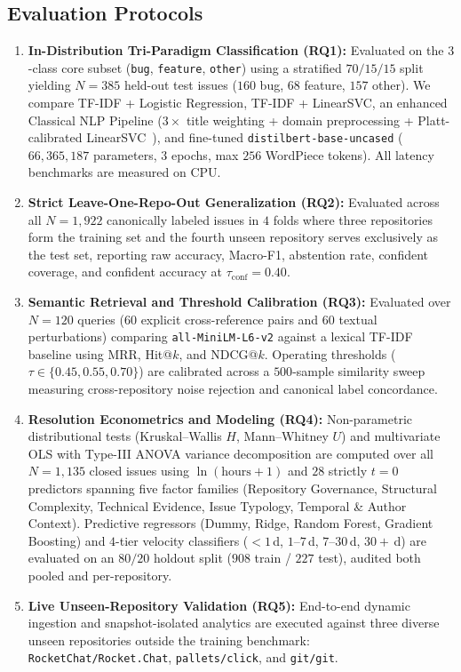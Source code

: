 \documentclass[conference]{IEEEtran}
\begin{document}
\subsection{Evaluation Protocols}
\begin{enumerate}
    \item \textbf{In-Distribution Tri-Paradigm Classification (RQ1):} Evaluated on the $3$-class core subset (\texttt{bug}, \texttt{feature}, \texttt{other}) using a stratified $70/15/15$ split yielding $N=385$ held-out test issues ($160$ bug, $68$ feature, $157$ other). We compare TF-IDF + Logistic Regression, TF-IDF + LinearSVC, an enhanced Classical NLP Pipeline ($3\times$ title weighting + domain preprocessing + Platt-calibrated LinearSVC~\cite{platt1999probabilistic}), and fine-tuned \texttt{distilbert-base-uncased} ($66{,}365{,}187$ parameters, $3$ epochs, max $256$ WordPiece tokens). All latency benchmarks are measured on CPU.
    \item \textbf{Strict Leave-One-Repo-Out Generalization (RQ2):} Evaluated across all $N=1{,}922$ canonically labeled issues in $4$ folds where three repositories form the training set and the fourth unseen repository serves exclusively as the test set, reporting raw accuracy, Macro-F1, abstention rate, confident coverage, and confident accuracy at $\tau_{\text{conf}}=0.40$.
    \item \textbf{Semantic Retrieval and Threshold Calibration (RQ3):} Evaluated over $N=120$ queries ($60$ explicit cross-reference pairs and $60$ textual perturbations) comparing \texttt{all-MiniLM-L6-v2} against a lexical TF-IDF baseline using MRR, Hit@$k$, and NDCG@$k$. Operating thresholds ($\tau \in \{0.45, 0.55, 0.70\}$) are calibrated across a $500$-sample similarity sweep measuring cross-repository noise rejection and canonical label concordance.
    \item \textbf{Resolution Econometrics and Modeling (RQ4):} Non-parametric distributional tests (Kruskal--Wallis $H$, Mann--Whitney $U$) and multivariate OLS with Type-III ANOVA variance decomposition are computed over all $N=1{,}135$ closed issues using $\ln(\text{hours}+1)$ and $28$ strictly $t=0$ predictors spanning five factor families (Repository Governance, Structural Complexity, Technical Evidence, Issue Typology, Temporal \& Author Context). Predictive regressors (Dummy, Ridge, Random Forest, Gradient Boosting) and $4$-tier velocity classifiers ($<1$\,d, $1$--$7$\,d, $7$--$30$\,d, $30+$\,d) are evaluated on an $80/20$ holdout split ($908$ train / $227$ test), audited both pooled and per-repository.
    \item \textbf{Live Unseen-Repository Validation (RQ5):} End-to-end dynamic ingestion and snapshot-isolated analytics are executed against three diverse unseen repositories outside the training benchmark: \texttt{RocketChat/Rocket.Chat}, \texttt{pallets/click}, and \texttt{git/git}.
\end{enumerate}
\end{document}
